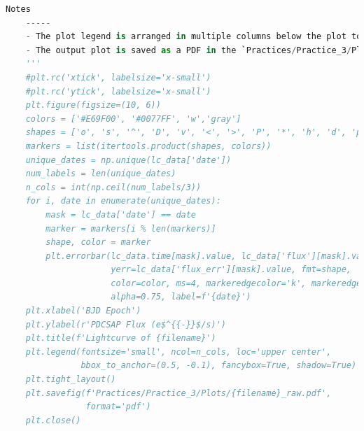 \documentclass[a4paper,12pt]{article}
\newenvironment{solution}{}{}
\begin{document}
\begin{enumerate}
\begin{solution}
\begin{lstlisting}[language=Python]
    Notes
    -----
    - The plot legend is arranged in multiple columns below the plot to avoid overlapping data.
    - The output plot is saved as a PDF in the `Practices/Practice_3/Plots/` directory.
    '''
    #plt.rc('xtick', labelsize='x-small')
    #plt.rc('ytick', labelsize='x-small')
    plt.figure(figsize=(10, 6))
    colors = ['#E69F00', '#0077FF', 'w','gray']
    shapes = ['o', 's', '^', 'D', 'v', '<', '>', 'P', '*', 'h', 'd', 'p']
    markers = list(itertools.product(shapes, colors))
    unique_dates = np.unique(lc_data['date'])
    num_labels = len(unique_dates)
    n_cols = int(np.ceil(num_labels/3))
    for i, date in enumerate(unique_dates):
        mask = lc_data['date'] == date
        marker = markers[i % len(markers)]
        shape, color = marker
        plt.errorbar(lc_data.time[mask].value, lc_data['flux'][mask].value,
                     yerr=lc_data['flux_err'][mask].value, fmt=shape,
                     color=color, ms=4, markeredgecolor='k', markeredgewidth=0.5,
                     alpha=0.75, label=f'{date}')
    plt.xlabel('BJD Epoch')
    plt.ylabel(r'PDCSAP Flux (e$^{{-}}$/s)')
    plt.title(f'Lightcurve of {filename}')
    plt.legend(fontsize='small', ncol=n_cols, loc='upper center',
               bbox_to_anchor=(0.5, -0.1), fancybox=True, shadow=True)
    plt.tight_layout()
    plt.savefig(f'Practices/Practice_3/Plots/{filename}_raw.pdf',
                format='pdf')
    plt.close()


\end{lstlisting}
\end{solution}
\end{enumerate}
\end{document}
